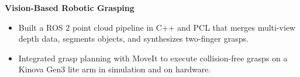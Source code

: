 \textbf{Vision-Based Robotic Grasping}
\begin{itemize}
  \item Built a ROS 2 point cloud pipeline in C++ and PCL that merges multi-view depth data, segments objects, and synthesizes two-finger grasps.
  \item Integrated grasp planning with MoveIt to execute collision-free grasps on a Kinova Gen3 lite arm in simulation and on hardware.
\end{itemize}
